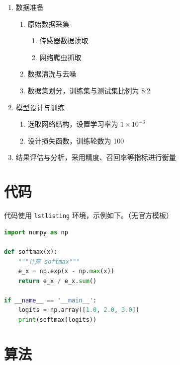 \begin{enumerate}[label=(\arabic*)]
    \item 数据准备
    \begin{enumerate}[label=\arabic*)]
        \item 原始数据采集
        \begin{enumerate}[label=\Circled{\arabic*}]
            \item 传感器数据读取
            \item 网络爬虫抓取
        \end{enumerate}
        \item 数据清洗与去噪
        \item 数据集划分，训练集与测试集比例为 8:2
    \end{enumerate}
    \item 模型设计与训练
    \begin{enumerate}[label=\arabic*)]
        \item 选取网络结构，设置学习率为 $1\times10^{-3}$
        \item 设计损失函数，训练轮数为 100
    \end{enumerate}
    \item 结果评估与分析，采用精度、召回率等指标进行衡量
\end{enumerate}

\section{代码}
\label{sec:code}

代码使用 \texttt{lstlisting} 环境，示例如下。（无官方模板）

\begin{lstlisting}[language=Python]
import numpy as np

def softmax(x):
    """计算 softmax"""
    e_x = np.exp(x - np.max(x))
    return e_x / e_x.sum()

if __name__ == '__main__':
    logits = np.array([1.0, 2.0, 3.0])
    print(softmax(logits))
\end{lstlisting}

\section{算法}
\label{sec:algorithm}

